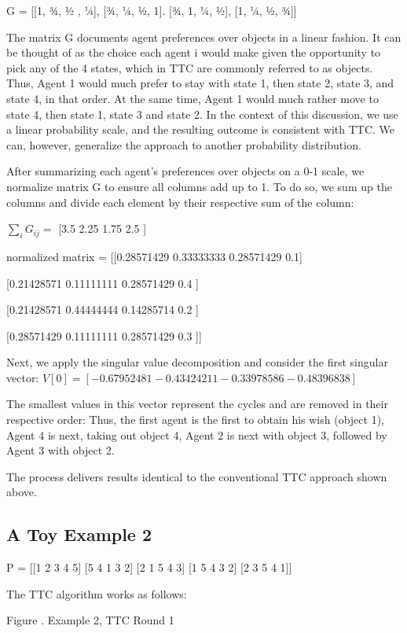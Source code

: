 G = 	[[1, ¾, ½ , ¼],
	[¾, ¼, ½, 1].
[¾, 1, ¼, ½],
[1, ¼, ½, ¾]]

The matrix G documents agent preferences over objects in a linear fashion. It can be thought of as the choice each agent i would make given the opportunity to pick any of the 4 states, which in TTC are commonly referred to as objects. Thus, Agent 1 would much prefer to stay with state 1, then state 2, state 3, and state 4, in that order. At the same time, Agent 1 would much rather move to state 4, then state 1, state 3 and state 2. In the context of this discussion, we use a linear probability scale, and the resulting outcome is consistent with TTC. We can, however, generalize the approach to another probability distribution. 

After summarizing each agent’s preferences over objects on a 0-1 scale, we normalize matrix G to ensure all columns add up to 1. To do so, we sum up the columns and divide each element by their respective sum of the column:

$\sum_i G_{ij}=$  [3.5    2.25    1.75     2.5 ]

normalized matrix =  	[[0.28571429 0.33333333 0.28571429 0.1]

    [0.21428571 0.11111111 0.28571429 0.4       ]
    
    [0.21428571 0.44444444 0.14285714 0.2       ]
    
    [0.28571429 0.11111111 0.28571429 0.3       ]]

Next, we apply the singular value decomposition and consider the first singular vector:
$V[0]= [-0.67952481 -0.43424211 -0.33978586 -0.48396838]$

The smallest values in this vector represent the cycles and are removed in their respective order:
Thus, the first agent is the first to obtain his wish (object 1), 
Agent 4 is next, taking out object 4, 
Agent 2 is next with object 3, followed by 
Agent 3 with object 2.

The process delivers results identical to the conventional TTC approach shown above. 


\subsection{A Toy Example 2}
\textbf{}

P =  [[1 2 3 4 5]
 [5 4 1 3 2]
 [2 1 5 4 3]
 [1 5 4 3 2]
 [2 3 5 4 1]]

The TTC algorithm works as follows:


Figure . Example 2, TTC Round 1

